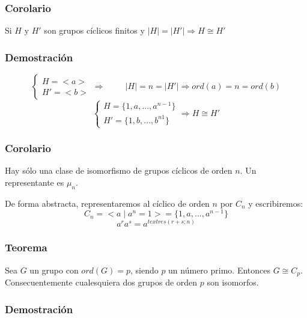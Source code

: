 \documentclass[11pt,a4paper]{article}
\begin{document}
\subsubsection*{Corolario}

Si $H$ y $H'$ son grupos cíclicos finitos y $|H| = |H'| \Rightarrow H \cong H'$

\subsubsection*{Demostración}

\begin{equation*}
\begin{cases}
H = <a> \\
H' = <b>
\end{cases}
\Rightarrow \hspace{1cm} |H| = n = |H'| \Rightarrow ord(a) = n = ord(b)
\end{equation*}
\begin{equation*}
\begin{cases}
H = \{1, a, ..., a^{n-1}\} \\
H' = \{1, b, ..., b^{n1}\}
\end{cases}
\Rightarrow H \cong H'
\end{equation*}

\subsubsection*{Corolario}

Hay sólo una clase de isomorfismo de grupos cíclicos de orden $n$. Un representante es $\mu_{n}$. 

De forma abstracta, representaremos al cíclico de orden $n$ por $C_{n}$ y escribiremos:
$$C_{n} = <a \mid a^{n} = 1> = \{1, a, ..., a^{n-1}\}$$
$$a^{r}a^{s} = a^{text{res}(r+s;n)}$$

\subsubsection*{Teorema}

Sea $G$ un grupo con $ord(G) = p$, siendo $p$ un número primo. Entonces $G \cong C_{p}$. \\
Consecuentemente cualesquiera dos grupos de orden $p$ son isomorfos.

\subsubsection*{Demostración}
\end{document}
